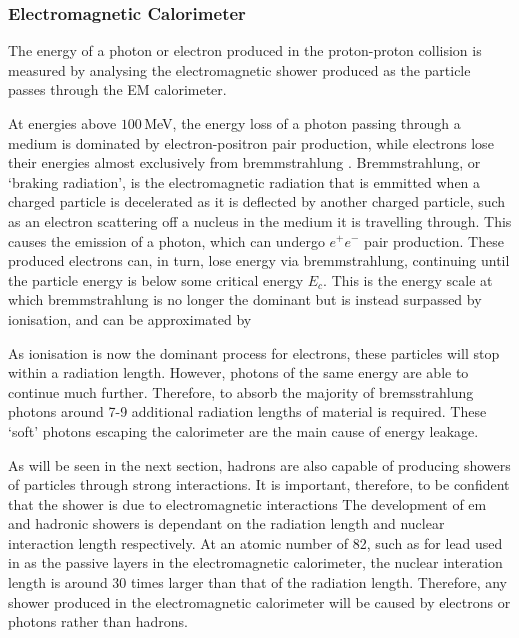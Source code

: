 \documentclass{article}
\begin{document}
\subsubsection{Electromagnetic Calorimeter}
\label{sec:ATLAS_DetectorSchematics_ECAL}

The energy of a photon or electron produced in the proton-proton collision is measured by analysing the electromagnetic shower produced as the particle passes through the EM calorimeter. 

At energies above $100\,$MeV, the energy loss of a photon passing through a medium is dominated by electron-positron pair production, while electrons lose their energies almost exclusively from bremmstrahlung \cite{RPP}. 
Bremmstrahlung, or `braking radiation', is the electromagnetic radiation that is emmitted when a charged particle is decelerated as it is deflected by another charged particle, such as an electron scattering off a nucleus in the medium it is travelling through. This causes the emission of a photon, which can undergo $e^+e^-$ pair production. These produced electrons can, in turn, lose energy via bremmstrahlung, continuing until the particle energy is below some critical energy $E_c$. This is the energy scale at which bremmstrahlung is no longer the dominant but is instead surpassed by ionisation, and can be approximated by 

As ionisation is now the dominant process for electrons, these particles will stop within a radiation length. However, photons of the same energy are able to continue much further. Therefore, to absorb the majority of bremsstrahlung photons around 7-9 additional radiation lengths of material is required. These `soft' photons escaping the calorimeter are the main cause of energy leakage.

As will be seen in the next section, hadrons are also capable of producing showers of particles through strong interactions. It is important, therefore, to be confident that the shower is due to electromagnetic interactions
The development of em and hadronic showers is dependant on the radiation length and nuclear interaction length respectively. At an atomic number of 82, such as for lead used in as the passive layers in the electromagnetic calorimeter, the nuclear interation length is around 30 times larger than that of the radiation length. Therefore, any shower produced in the electromagnetic calorimeter will be caused by electrons or photons rather than hadrons.
\end{document}
